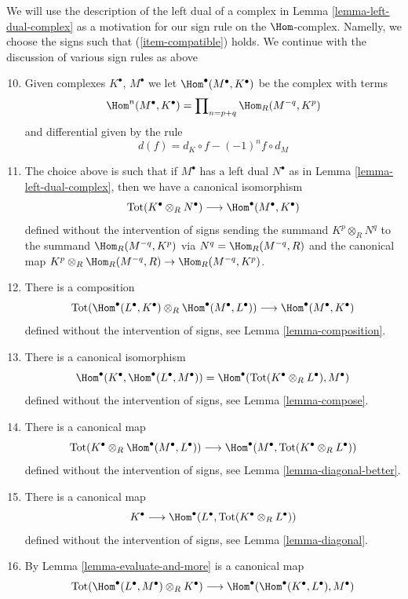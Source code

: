 \noindent
We will use the description of the left dual of a complex
in Lemma \ref{lemma-left-dual-complex} as a motivation for our sign rule on the
$\Hom$-complex. Namelly, we choose the signs such that
(\ref{item-compatible}) holds.
We continue with the discussion of various sign rules as above
\begin{enumerate}
\setcounter{enumi}{9}
\item Given complexes $K^\bullet$, $M^\bullet$ we let
$\Hom^\bullet(M^\bullet, K^\bullet)$ be the complex with
terms
$$
\Hom^n(M^\bullet, K^\bullet) = \prod\nolimits_{n = p + q} \Hom_R(M^{-q}, K^p)
$$
and differential given by the rule
$$
d(f) = d_K \circ f - (-1)^n f \circ d_M
$$
\item
\label{item-compatible}
The choice above is such that if $M^\bullet$ has a left
dual $N^\bullet$ as in Lemma \ref{lemma-left-dual-complex},
then we have a canonical isomorphism
$$
\text{Tot}(K^\bullet \otimes_R N^\bullet)
\longrightarrow
\Hom^\bullet(M^\bullet, K^\bullet)
$$
defined without the intervention of signs sending the summand
$K^p \otimes_R N^q$ to the summand $\Hom_R(M^{-q}, K^p)$
via $N^q = \Hom_R(M^{-q}, R)$ and the canonical map
$K^p \otimes_R \Hom_R(M^{-q}, R) \to \Hom_R(M^{-q}, K^p)$.
\item There is a composition
$$
\text{Tot}(
\Hom^\bullet(L^\bullet, K^\bullet) \otimes_R
\Hom^\bullet(M^\bullet, L^\bullet))
\longrightarrow
\Hom^\bullet(M^\bullet, K^\bullet)
$$
defined without the intervention of signs, see
Lemma \ref{lemma-composition}.
\item There is a canonical isomorphism
$$
\Hom^\bullet(K^\bullet, \Hom^\bullet(L^\bullet, M^\bullet))
=
\Hom^\bullet(\text{Tot}(K^\bullet \otimes_R L^\bullet), M^\bullet)
$$
defined without the intervention of signs, see
Lemma \ref{lemma-compose}.
\item There is a canonical map
$$
\text{Tot}(K^\bullet \otimes_R \Hom^\bullet(M^\bullet, L^\bullet))
\longrightarrow
\Hom^\bullet(M^\bullet, \text{Tot}(K^\bullet \otimes_R L^\bullet))
$$
defined without the intervention of signs, see
Lemma \ref{lemma-diagonal-better}.
\item There is a canonical map
$$
K^\bullet
\longrightarrow
\Hom^\bullet(L^\bullet, \text{Tot}(K^\bullet \otimes_R L^\bullet))
$$
defined without the intervention of signs, see
Lemma \ref{lemma-diagonal}.
\item By Lemma \ref{lemma-evaluate-and-more} is a canonical map
$$
\text{Tot}(\Hom^\bullet(L^\bullet, M^\bullet) \otimes_R K^\bullet)
\longrightarrow
\Hom^\bullet(\Hom^\bullet(K^\bullet, L^\bullet), M^\bullet)
$$
\end{enumerate}
